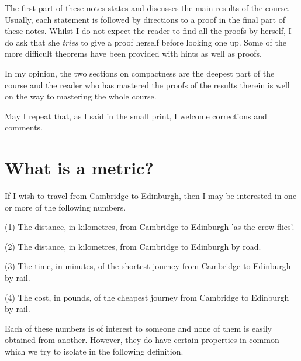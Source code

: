 The first part of these notes states and discusses the main results of the course. Usually, each statement is followed by directions to a proof in the final part of these notes. Whilst I do not expect the reader to find all the proofs by herself, I do ask that she \emph{tries} to give a proof herself before looking one up. Some of the more difficult theorems have been provided with hints as well as proofs.

In my opinion, the two sections on compactness are the deepest part of the course and the reader who has mastered the proofs of the results therein is well on the way to mastering the whole course.

May I repeat that, as I said in the small print, I welcome corrections and comments.


\section{What is a metric?} If I wish to travel from Cambridge to Edinburgh, then I may be interested in one or more of the following numbers.

(1) The distance, in kilometres, from Cambridge to Edinburgh 'as the crow flies'.

(2) The distance, in kilometres, from Cambridge to Edinburgh by road.

(3) The time, in minutes, of the shortest journey from Cambridge to Edinburgh by rail.

(4) The cost, in pounds, of the cheapest journey from Cambridge to Edinburgh by rail.

Each of these numbers is of interest to someone and none of them is easily obtained from another. However, they do have certain properties in common which we try to isolate in the following definition.

